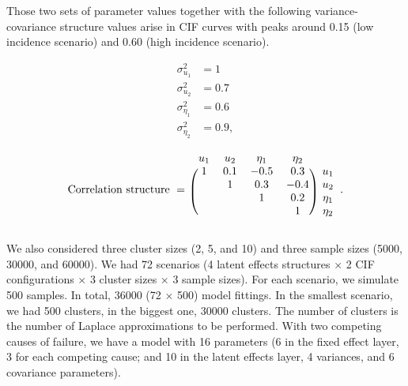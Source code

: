 \documentclass[a4paper,12pt]{article}
\begin{document}
Those two sets of parameter values together with the following
variance-covariance structure values arise in CIF curves with peaks
around 0.15 (low incidence scenario) and 0.60 (high incidence scenario).

\begin{minipage}{0.15\textwidth}
 \begin{align*}
  \sigma_{u_{1}}^{2}   &= 1\\
  \sigma_{u_{2}}^{2}   &= 0.7\\
  \sigma_{\eta_{1}}^{2} &= 0.6\\
  \sigma_{\eta_{2}}^{2} &= 0.9,
 \end{align*}
\end{minipage}%
\begin{minipage}{0.85\textwidth}
 \[
  \text{Correlation structure}~=~\begin{blockarray}{ccccc}
                                  u_{1} & u_{2} & \eta_{1} & \eta_{2}\\
                                  \begin{block}{(cccc)c}
                                   1 & 0.1 & -0.5 &  0.3 & u_{1}\\
                                     &   1 &  0.3 & -0.4 & u_{2}\\
                                     &     &    1 &  0.2 & \eta_{1}\\
                                     &     &      &    1 & \eta_{2}\\
                                  \end{block}
                                 \end{blockarray}.
 \]
\end{minipage}

\vspace{0.3cm}
\noindent
We also considered three cluster sizes (2, 5, and 10) and three sample
sizes (5000, 30000, and 60000). We had 72 scenarios (4 latent effects
structures \(\times\) 2 CIF configurations \(\times\) 3 cluster sizes
\(\times\) 3 sample sizes). For each scenario, we simulate 500
samples. In total, 36000 (72 \(\times\) 500) model fittings. In the
smallest scenario, we had 500 clusters, in the biggest one, 30000
clusters. The number of clusters is the number of Laplace approximations
to be performed. With two competing causes of failure, we have a model
with 16 parameters (6 in the fixed effect layer, 3 for each competing
cause; and 10 in the latent effects layer, 4 variances, and 6 covariance
parameters).
\end{document}
